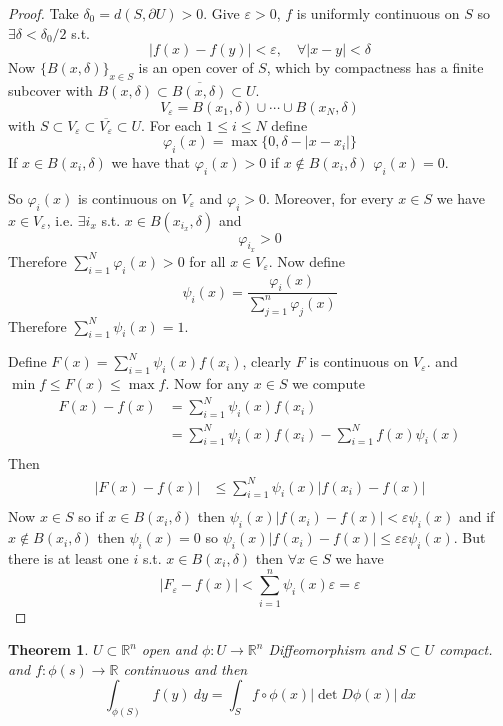 \documentclass[11pt,openany]{book}
\theoremstyle{plain}
\newtheorem{theorem}{Theorem}[chapter]
\theoremstyle{definition}
\theoremstyle{remark}
\newcommand{\R}{\mathbb{R}}
\newcommand{\set}[1]{\{ #1 \}}
\newcommand{\abs}[1]{\lvert #1 \rvert}
\begin{document}
\begin{proof}
    Take $\delta_0 = d(S, \partial U) > 0$. Give $\varepsilon > 0$, $f$ is uniformly continuous on $S$
    so $\exists \delta < \delta_0 / 2$ s.t. 
    $$\abs{f(x) - f(y)} < \varepsilon, \quad \forall \abs{x-y} < \delta$$
    Now $\set{B(x,\delta)}_{x \in S}$ is an open cover of $S$, which by compactness has a finite subcover 
    with $B(x,\delta) \subset \overline{B(x,\delta)} \subset U$. 
    $$V_\varepsilon = B(x_1, \delta) \cup \cdots \cup B(x_N, \delta)$$
    with $S \subset V_\varepsilon \subset \overline{V_\varepsilon} \subset U$. 
    For each $1 \le i \le N$ define 
    $$\varphi_i(x) = \max \set{0, \delta - \abs{x-x_i}}$$
    If $x \in B(x_i, \delta)$ we have that $\varphi_i (x) > 0$ if 
    $x \not\in B(x_i, \delta)$ $\varphi_i(x) = 0$. 

    So $\varphi_i(x)$ is continuous on $V_\varepsilon$ and $\varphi_i > 0$. Moreover, for 
    every $x \in S$ we have $x \in V_\varepsilon$, i.e. $\exists i_x$ s.t. 
    $x \in B(x_{i_x}, \delta)$ and 
    $$\varphi_{i_x} > 0$$
    Therefore $\sum_{i=1}^N \varphi_i (x) > 0$ for all $x \in V_\varepsilon$. 
    Now define 
    $$\psi_i (x) = \frac{\varphi_i(x)}{\sum_{j=1}^n \varphi_j(x)}$$
    Therefore $\sum_{i=1}^N \psi_i(x) = 1$. 
    
    Define $F(x) = \sum_{i=1}^N \psi_i(x) f (x_i)$, clearly $F$ is continuous on $V_\varepsilon$. 
    and $\min f \le F(x) \le \max f$. Now for any $x \in S$ we compute 
    \begin{align*}
        F(x) - f(x) &= \sum_{i=1}^N \psi_i(x) f(x_i) \\
        &= \sum_{i=1}^N \psi_i(x) f(x_i) - \sum_{i=1}^N f(x) \psi_i(x) \\
    \end{align*}
    Then 
    \begin{align*}
        \abs{F(x) - f(x)} &\le \sum_{i=1}^N \psi_i(x) \abs{f(x_i) - f(x)} \\
    \end{align*}
    Now $x \in S$ so if $x \in B(x_i, \delta)$ then $\psi_i(x) \abs{f(x_i) - f(x)} < \varepsilon \psi_i(x)$ 
    and if $x \not\in B(x_i, \delta)$ then $\psi_i(x) = 0$ so $\psi_i(x) \abs{f(x_i) - f(x)} \le \varepsilon\varepsilon \psi_i(x)$. 
    But there is at least one $i$ s.t. $x \in B(x_i, \delta)$ then $\forall x \in S$ we have 
    $$\abs{F_\varepsilon - f(x)} < \sum_{i=1}^n \psi_i(x) \varepsilon = \varepsilon$$
\end{proof}

\begin{theorem}
    $U \subset \R^n$ open and $\phi \colon U \to \R^n$ Diffeomorphism and $S \subset U$ compact. 
    and $f \colon \phi(s) \to \R$ continuous and then 
    $$\int_{\phi(S)} f(y) \ dy = \int_S f \circ \phi (x) \abs{\det D\phi(x)} \ dx$$ 
\end{theorem}
\end{document}
